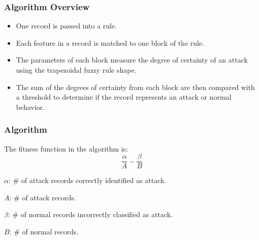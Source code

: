 \documentclass{beamer}
\begin{document}
\begin{frame}
	\frametitle{Algorithm Overview}
	\begin{itemize}
		\item One record is passed into a rule.
		\item Each feature in a record is matched to one block of the rule.
		\item The parameters of each block measure the degree of certainty of an attack using the trapezoidal fuzzy rule shape.
		\item The sum of the degrees of certainty from each block are then compared with a threshold to determine if the record represents an attack or normal behavior.
	\end{itemize}
\end{frame}

\begin{frame}
	\frametitle{Algorithm}


	The fitness function in the algorithm is:
	\begin{equation*}
	\frac{\alpha}{A} - \frac{\beta}{B}
	\end{equation*}

	$\alpha$: \# of attack records correctly identified as attack.

	$A$: \# of attack records.

	$\beta$: \# of normal records incorrectly classified as attack.
	
	$B$: \# of normal records. 
	
\end{frame}
\end{document}
